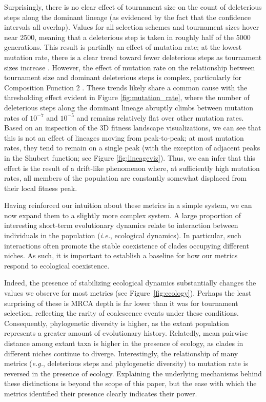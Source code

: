\documentclass[letterpaper]{article}
\begin{document}
Surprisingly, there is no clear effect of tournament size on the count of deleterious steps along the dominant lineage (as evidenced by the fact that the confidence intervals all overlap). Values for all selection schemes and tournament sizes hover near 2500, meaning that a deleterious step is taken in roughly half of the 5000 generations. This result is partially an effect of mutation rate; at the lowest mutation rate, there is a clear trend toward fewer deleterious steps as tournament sizes increase \citep{supplement}. However, the effect of mutation rate on the relationship between tournament size and dominant deleterious steps is complex, particularly for Composition Function 2 \citep{supplement}. These trends likely share a common cause with the thresholding effect evident in Figure \ref{fig:mutation_rate}, where the number of deleterious steps along the dominant lineage abruptly climbs between mutation rates of %
$10^{-7}$ and $10^{-5}$
and remains relatively flat over other mutation rates. Based on an inspection of the 3D fitness landscape visualizations, we can see that this is not an effect of lineages moving from peak-to-peak; at most mutation rates, they tend to remain on a single peak (with the exception of adjacent peaks in the Shubert function; see Figure \ref{fig:lineageviz}). Thus, we can infer that this effect is the result of a drift-like phenomenon where, at sufficiently high mutation rates, all members of the population are constantly somewhat displaced from their local fitness peak.

Having reinforced our intuition about these metrics in a simple system, we can now expand them to a slightly more complex system. A large proportion of interesting short-term evolutionary dynamics relate to interaction between individuals in the population (\textit{i.e.}, ecological dynamics). In particular, such interactions often promote the stable coexistence of clades occupying different niches. As such, it is important to establish a baseline for how our metrics respond to ecological coexistence. 

Indeed, the presence of stabilizing ecological dynamics substantially changes the values we observe for most metrics (see Figure~\ref{fig:ecology}). Perhaps the least surprising of these is MRCA depth is far lower than it was for tournament selection, reflecting the rarity of coalescence events under these conditions. Consequently, phylogenetic diversity is higher, as the extant population represents a greater amount of evolutionary history. Relatedly, mean pairwise distance among extant taxa is higher in the presence of ecology, as clades in different niches continue to diverge. Interestingly, the relationship of many metrics (\textit{e.g.}, deleterious steps and phylogenetic diversity) to mutation rate is reversed in the presence of ecology. Explaining the underlying mechanisms behind these distinctions is beyond the scope of this paper, but the ease with which the metrics identified their presence clearly indicates their power.
\end{document}
